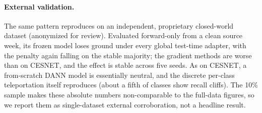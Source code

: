 \paragraph{External validation.} The same pattern reproduces on an independent,
proprietary closed-world dataset (anonymized for review). Evaluated forward-only
from a clean source week, its frozen model loses ground under every global
test-time adapter, with the penalty again falling on the stable majority; the
gradient methods are worse than on CESNET, and the effect is stable across five
seeds. As on CESNET, a from-scratch DANN model is essentially neutral, and the
discrete per-class teleportation itself reproduces (about a fifth of classes show
recall cliffs). The 10\% sample makes these absolute numbers non-comparable to the
full-data figures, so we report them as single-dataset external corroboration, not
a headline result.

